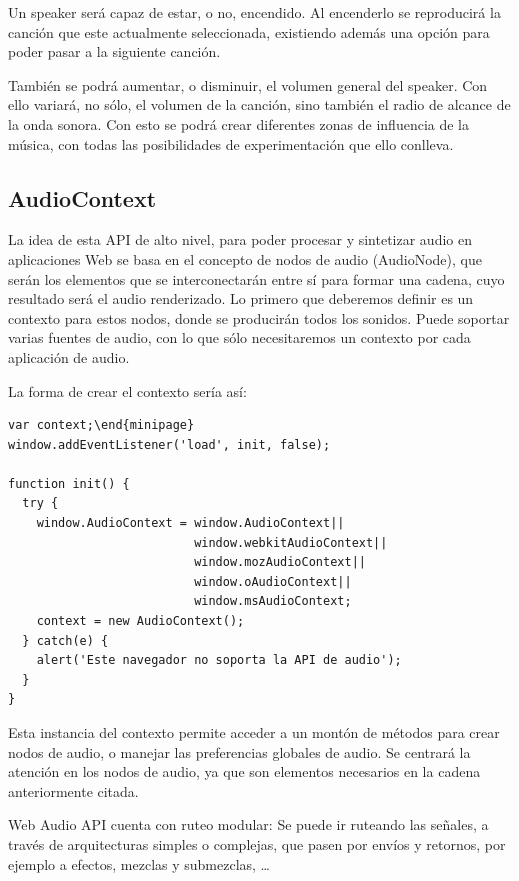 Un speaker será capaz de estar, o no, encendido. Al encenderlo se reproducirá la canción que este actualmente seleccionada, existiendo además una opción para poder pasar a la siguiente canción.
 
También se podrá aumentar, o disminuir, el volumen general del speaker. Con ello variará, no sólo, el volumen de la canción, sino también el radio de alcance de la onda sonora. Con esto se podrá crear diferentes zonas de influencia de la música, con todas las posibilidades de experimentación que ello conlleva.


\subsection{AudioContext}
\label{sec:audio_context}
La idea de esta API de alto nivel, para poder procesar y sintetizar audio en aplicaciones Web se basa en el concepto de nodos de audio (AudioNode), que serán los elementos que se interconectarán entre sí para formar una cadena, cuyo resultado será el audio renderizado. Lo primero que deberemos definir es un contexto para estos nodos, donde se producirán todos los sonidos. Puede soportar varias fuentes de audio, con lo que sólo necesitaremos un contexto por cada aplicación de audio.

La forma de crear el contexto sería así:
\begin{verbatim}
var context;\end{minipage}
window.addEventListener('load', init, false);

function init() {
  try {
    window.AudioContext = window.AudioContext||
                          window.webkitAudioContext||
                          window.mozAudioContext||
                          window.oAudioContext||
                          window.msAudioContext;
    context = new AudioContext();
  } catch(e) {
    alert('Este navegador no soporta la API de audio');
  }
}
\end{verbatim}

Esta instancia del contexto  permite acceder a un montón de métodos para crear nodos de audio, o manejar las preferencias globales de audio. Se centrará la atención en los nodos de audio, ya que son elementos necesarios en la cadena anteriormente citada.

Web Audio API cuenta con ruteo modular: Se puede ir ruteando las señales, a través de arquitecturas simples o complejas, que pasen por envíos y retornos, por ejemplo a efectos, mezclas y submezclas, …\\

